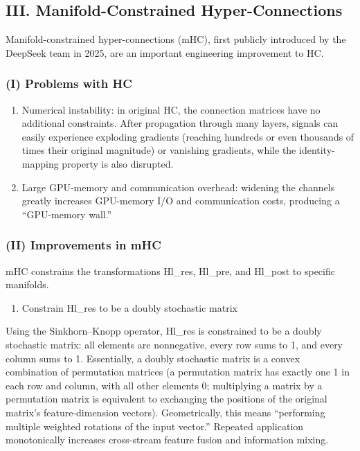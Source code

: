 \hypertarget{iii.-manifold-constrained-hyper-connections}{%
\subsection{III. Manifold-Constrained Hyper-Connections}\label{iii.-manifold-constrained-hyper-connections}}

Manifold-constrained hyper-connections (mHC), first publicly introduced by the DeepSeek team in 2025, are an important engineering improvement to HC.

\hypertarget{i-problems-with-hc}{%
\subsubsection{(I) Problems with HC}\label{i-problems-with-hc}}

\begin{enumerate}
\def\labelenumi{\arabic{enumi}.}
\item
  Numerical instability: in original HC, the connection matrices have no additional constraints. After propagation through many layers, signals can easily experience exploding gradients (reaching hundreds or even thousands of times their original magnitude) or vanishing gradients, while the identity-mapping property is also disrupted.
\item
  Large GPU-memory and communication overhead: widening the channels greatly increases GPU-memory I/O and communication costs, producing a ``GPU-memory wall.''
\end{enumerate}

\hypertarget{ii-improvements-in-mhc}{%
\subsubsection{(II) Improvements in mHC}\label{ii-improvements-in-mhc}}

mHC constrains the transformations Hl\_res, Hl\_pre, and Hl\_post to specific manifolds.

\begin{enumerate}
\def\labelenumi{\arabic{enumi}.}
\tightlist
\item
  Constrain Hl\_res to be a doubly stochastic matrix
\end{enumerate}

Using the Sinkhorn--Knopp operator, Hl\_res is constrained to be a doubly stochastic matrix: all elements are nonnegative, every row sums to 1, and every column sums to 1. Essentially, a doubly stochastic matrix is a convex combination of permutation matrices (a permutation matrix has exactly one 1 in each row and column, with all other elements 0; multiplying a matrix by a permutation matrix is equivalent to exchanging the positions of the original matrix's feature-dimension vectors). Geometrically, this means ``performing multiple weighted rotations of the input vector.'' Repeated application monotonically increases cross-stream feature fusion and information mixing.

